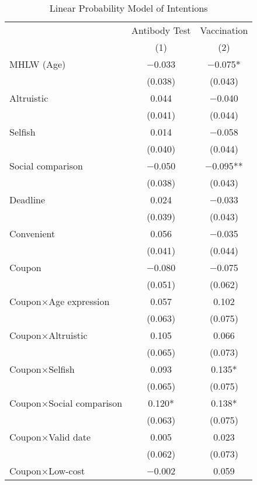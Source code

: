 \begin{table}

\caption{Linear Probability Model of Intentions \label{tab:int-reg}}
\centering
\fontsize{9}{11}\selectfont
\begin{threeparttable}
\begin{tabular}[t]{lcc}
\toprule
\multicolumn{1}{c}{ } & \multicolumn{1}{c}{Antibody Test} & \multicolumn{1}{c}{Vaccination} \\
\cmidrule(l{3pt}r{3pt}){2-2} \cmidrule(l{3pt}r{3pt}){3-3}
  & (1) & (2)\\
\midrule
MHLW (Age) & \num{-0.033} & \num{-0.075}*\\
 & (\num{0.038}) & \vphantom{1} (\num{0.043})\\
Altruistic & \num{0.044} & \num{-0.040}\\
 & (\num{0.041}) & \vphantom{1} (\num{0.044})\\
Selfish & \num{0.014} & \num{-0.058}\\
 & (\num{0.040}) & (\num{0.044})\\
Social comparison & \num{-0.050} & \num{-0.095}**\\
 & (\num{0.038}) & (\num{0.043})\\
Deadline & \num{0.024} & \num{-0.033}\\
 & (\num{0.039}) & (\num{0.043})\\
Convenient & \num{0.056} & \num{-0.035}\\
 & (\num{0.041}) & (\num{0.044})\\
Coupon & \num{-0.080} & \num{-0.075}\\
 & (\num{0.051}) & (\num{0.062})\\
Coupon×Age expression & \num{0.057} & \num{0.102}\\
 & (\num{0.063}) & \vphantom{1} (\num{0.075})\\
Coupon×Altruistic & \num{0.105} & \num{0.066}\\
 & (\num{0.065}) & (\num{0.073})\\
Coupon×Selfish & \num{0.093} & \num{0.135}*\\
 & (\num{0.065}) & (\num{0.075})\\
Coupon×Social comparison & \num{0.120}* & \num{0.138}*\\
 & (\num{0.063}) & (\num{0.075})\\
Coupon×Valid date & \num{0.005} & \num{0.023}\\
 & (\num{0.062}) & (\num{0.073})\\
Coupon×Low-cost & \num{-0.002} & \num{0.059}\\

\end{tabular}
\end{threeparttable}
\end{table}
